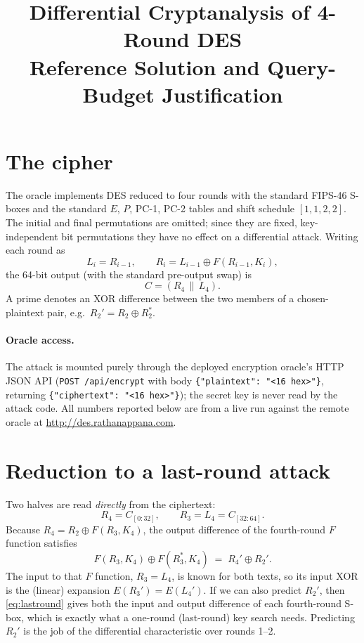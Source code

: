 \documentclass[11pt]{article}
\title{Differential Cryptanalysis of 4-Round DES\\\large Reference Solution and Query-Budget Justification}
\author{}
\date{}
\newcommand{\xor}{\oplus}
\begin{document}
\maketitle

\section{The cipher}

The oracle implements DES reduced to four rounds with the standard FIPS-46
S-boxes and the standard $E$, $P$, PC-1, PC-2 tables and shift schedule
$[1,1,2,2]$. The initial and final permutations are omitted; since they are
fixed, key-independent bit permutations they have no effect on a differential
attack. Writing each round as
\[
  L_i = R_{i-1}, \qquad R_i = L_{i-1} \xor F(R_{i-1}, K_i),
\]
the 64-bit output (with the standard pre-output swap) is
\[
  C = (R_4 \,\|\, L_4).
\]
A prime denotes an XOR difference between the two members of a chosen-plaintext
pair, e.g.\ $R_2' = R_2 \xor R_2^{*}$.

\paragraph{Oracle access.}
The attack is mounted purely through the deployed encryption oracle's HTTP JSON
API (\texttt{POST /api/encrypt} with body \texttt{\{"plaintext": "<16 hex>"\}},
returning \texttt{\{"ciphertext": "<16 hex>"\}}); the secret key is never read
by the attack code. All numbers reported below are from a live run against the
remote oracle at \url{http://des.rathanappana.com}.

\section{Reduction to a last-round attack}

Two halves are read \emph{directly} from the ciphertext:
\[
  R_4 = C_{[0:32]}, \qquad R_3 = L_4 = C_{[32:64]}.
\]
Because $R_4 = R_2 \xor F(R_3, K_4)$, the output difference of the fourth-round
$F$ function satisfies
\begin{equation}
  F(R_3, K_4)\xor F(R_3^{*},K_4) \;=\; R_4' \xor R_2'.
  \label{eq:lastround}
\end{equation}
The input to that $F$ function, $R_3 = L_4$, is known for both texts, so its
input XOR is the (linear) expansion $E(R_3')=E(L_4')$. If we can also predict
$R_2'$, then \eqref{eq:lastround} gives both the input and output difference of
each fourth-round S-box, which is exactly what a one-round (last-round) key
search needs. Predicting $R_2'$ is the job of the differential characteristic
over rounds 1--2.
\end{document}
